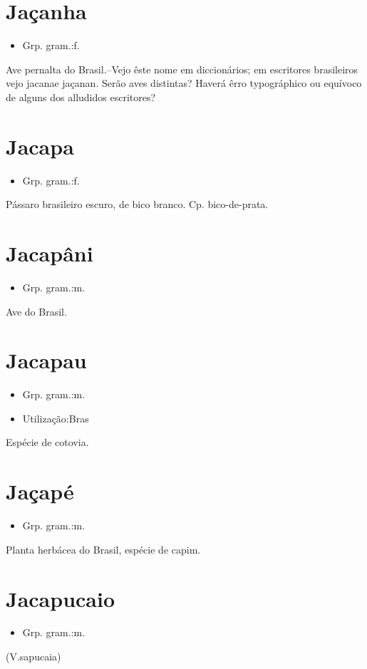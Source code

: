 \documentclass{article}
\begin{document}
\section{Jaçanha}
\begin{itemize}
\item {Grp. gram.:f.}
\end{itemize}
Ave pernalta do Brasil.--Vejo êste nome em diccionários; em escritores brasileiros vejo \textunderscore jacana\textunderscore  e \textunderscore jaçanan\textunderscore . Serão aves distintas? Haverá êrro typográphico ou equívoco de alguns dos alludidos escritores?
\section{Jacapa}
\begin{itemize}
\item {Grp. gram.:f.}
\end{itemize}
Pássaro brasileiro escuro, de bico branco.
Cp. \textunderscore bico-de-prata\textunderscore .
\section{Jacapâni}
\begin{itemize}
\item {Grp. gram.:m.}
\end{itemize}
Ave do Brasil.
\section{Jacapau}
\begin{itemize}
\item {Grp. gram.:m.}
\end{itemize}
\begin{itemize}
\item {Utilização:Bras}
\end{itemize}
Espécie de cotovia.
\section{Jaçapé}
\begin{itemize}
\item {Grp. gram.:m.}
\end{itemize}
Planta herbácea do Brasil, espécie de capim.
\section{Jacapucaio}
\begin{itemize}
\item {Grp. gram.:m.}
\end{itemize}
(V.sapucaia)
\end{document}
